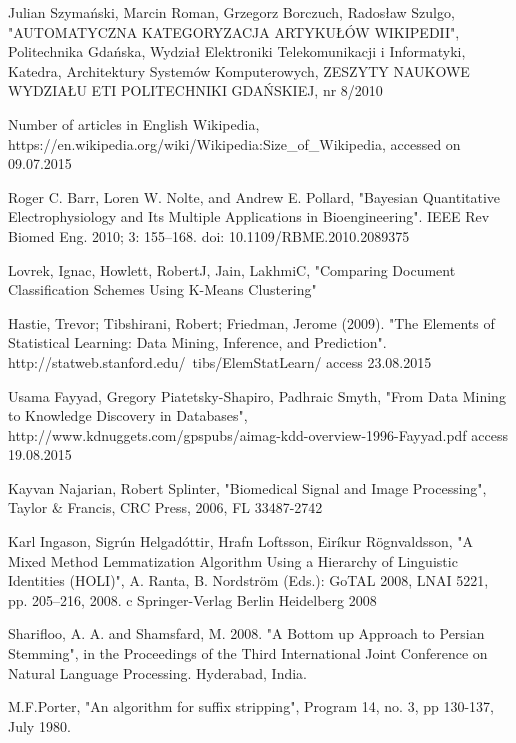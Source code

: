 \cleardoublepage
{}
{}
\begin{thebibliography}{99}

Julian Szymański, Marcin Roman, Grzegorz Borczuch, Radosław Szulgo, "AUTOMATYCZNA KATEGORYZACJA ARTYKUŁÓW WIKIPEDII", Politechnika Gdańska, Wydział Elektroniki Telekomunikacji i Informatyki, Katedra, Architektury Systemów Komputerowych, ZESZYTY NAUKOWE WYDZIAŁU ETI POLITECHNIKI GDAŃSKIEJ, nr 8/2010

Number of articles in English Wikipedia, https://en.wikipedia.org/wiki/Wikipedia:Size\_of\_Wikipedia, accessed on 09.07.2015

Roger C. Barr, Loren W. Nolte, and Andrew E. Pollard, "Bayesian Quantitative Electrophysiology and Its Multiple Applications in Bioengineering". IEEE Rev Biomed Eng. 2010; 3: 155–168.
doi:  10.1109/RBME.2010.2089375

Lovrek, Ignac, Howlett, RobertJ, Jain, LakhmiC, "Comparing Document Classification Schemes Using K-Means Clustering"


Hastie, Trevor; Tibshirani, Robert; Friedman, Jerome (2009). "The Elements of Statistical Learning: Data Mining, Inference, and Prediction". http://statweb.stanford.edu/~tibs/ElemStatLearn/ access 23.08.2015

Usama Fayyad, Gregory Piatetsky-Shapiro, Padhraic Smyth, "From Data Mining to Knowledge Discovery in Databases", http://www.kdnuggets.com/gpspubs/aimag-kdd-overview-1996-Fayyad.pdf access 19.08.2015

Kayvan Najarian, Robert Splinter, "Biomedical Signal and Image Processing", Taylor \& Francis, CRC Press, 2006, FL 33487-2742

Karl Ingason, Sigrún Helgadóttir, Hrafn Loftsson, Eiríkur Rögnvaldsson, "A Mixed Method Lemmatization Algorithm
Using a Hierarchy of Linguistic Identities (HOLI)", A. Ranta, B. Nordström (Eds.): GoTAL 2008, LNAI 5221, pp. 205–216, 2008.
c Springer-Verlag Berlin Heidelberg 2008

Sharifloo, A. A. and Shamsfard, M. 2008. "A Bottom up Approach to Persian Stemming", in the Proceedings of the Third International Joint Conference on Natural Language Processing. Hyderabad, India.

M.F.Porter, "An algorithm for suffix stripping", Program 14, no. 3, pp 130-137, July 1980.


\end{thebibliography}
